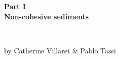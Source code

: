 
\vspace{100.35cm}
\begin{center}
\begin{huge}
{\bf Part I}\\
{\bf Non-cohesive sediments}
\end{huge}
\\
\begin{normalsize}
by Catherine Villaret \& Pablo Tassi
\end{normalsize}
\end{center}
